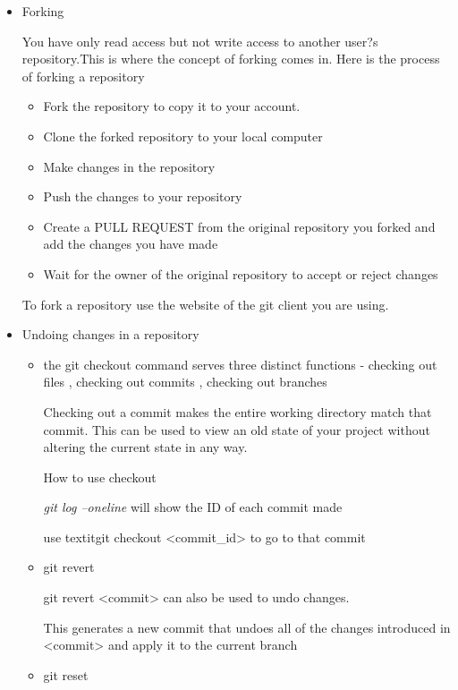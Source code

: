 \documentclass{article}
\begin{document}
\begin{itemize}
\item Forking 

You have only read access but not write access to another user?s repository.This is where the concept of forking comes in.
Here is the process of forking a repository

\begin{itemize}
\item Fork the repository to copy it to your account.
\item Clone the forked repository to your local computer
\item Make changes in the repository
\item Push the changes to your repository
\item Create a PULL REQUEST from the original repository you forked and add the changes you have made
\item Wait for the owner of the original repository to accept or reject changes
\end{itemize}

To fork a repository use the website of the git client you are using.

\item Undoing changes in a repository
\begin{itemize}
\item    the git checkout command serves three distinct functions - checking out files , checking out commits , checking out branches

Checking out a commit makes the entire working directory match that commit. This can be used to view an old state of your project without altering the current state in any way.

How to use checkout

\hspace{10mm} \textit{git log --oneline} will show the ID of each commit made 

\hspace{10mm} use textit{git checkout <commit\_id>} to go to that commit

\item git revert

\hspace{10mm} git revert <commit> can also be used to undo changes. 

\hspace {10mm} This generates a new commit that undoes all of the changes introduced in <commit>  and apply it to the current branch

\item git reset


\end{itemize}
\end{itemize}
\end{document}
